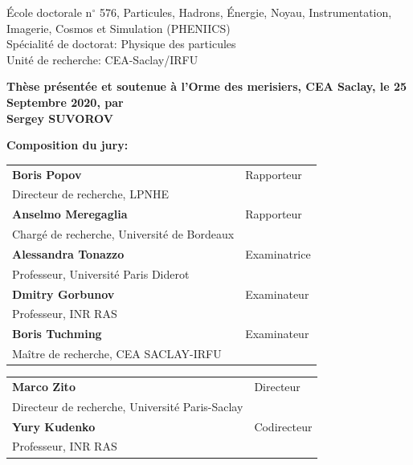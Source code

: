 \documentclass[../main.tex]{subfiles}
\begin{document}
\vspace{15mm}

École doctorale n$^{\circ}$ 576, Particules, Hadrons, Énergie, Noyau, Instrumentation,
Imagerie, Cosmos et Simulation (PHENIICS)\\
\small Spécialité de doctorat: Physique des particules\\
\footnotesize Unité de recherche: CEA-Saclay/IRFU\\
\vspace{15mm}

\textbf{Thèse présentée et soutenue à l'Orme des merisiers, CEA Saclay, le 25 Septembre 2020, par}\\
\bigskip
\Large {\color{Prune} \textbf{Sergey SUVOROV}}


\vspace{\fill} %

\flushleft \small \textbf{Composition du jury:}
\bigskip



\scriptsize
\begin{tabular}{|p{8cm}l}
\textbf{Boris Popov} &   Rapporteur\\
Directeur de recherche, LPNHE & \\
\textbf{Anselmo Meregaglia} &  Rapporteur \\
Chargé de recherche, Université de Bordeaux  &   \\

\textbf{Alessandra Tonazzo} &  Examinatrice \\
Professeur, Université Paris Diderot   &   \\
\textbf{Dmitry Gorbunov} &  Examinateur \\
Professeur, INR RAS   &   \\
\textbf{Boris Tuchming} &  Examinateur \\
Maître de recherche, CEA SACLAY-IRFU   &   \\

\end{tabular}

\medskip
\begin{tabular}{|p{8cm}l}\arrayrulecolor{white}
\textbf{Marco Zito} &   Directeur\\
Directeur de recherche, Université Paris-Saclay & \\
\textbf{Yury Kudenko} &   Codirecteur\\
Professeur, INR RAS  &   \\


\end{tabular}
\end{document}
